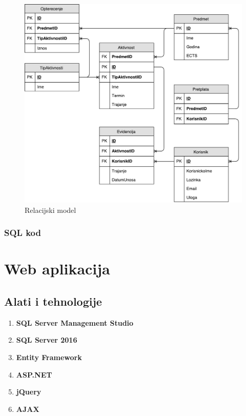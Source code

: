 \documentclass[times, utf8, zavrsni, numeric]{fer}
\begin{document}
\begin{figure}[H]
\centering
\includegraphics[scale=0.6]{img/relacijski-model.pdf}
\caption{Relacijski model}
\label{fig:relacijski-model}
\end{figure}

\subsection{SQL kod}
\lstset{style=sql}


\chapter{Web aplikacija}
\section{Alati i tehnologije}
\begin{enumerate}
\item \textbf{SQL Server Management Studio}
\item \textbf{SQL Server 2016}
\item \textbf{Entity Framework}
\item \textbf{ASP.NET}
\item \textbf{jQuery}
\item \textbf{AJAX}
\end{enumerate}
\end{document}
